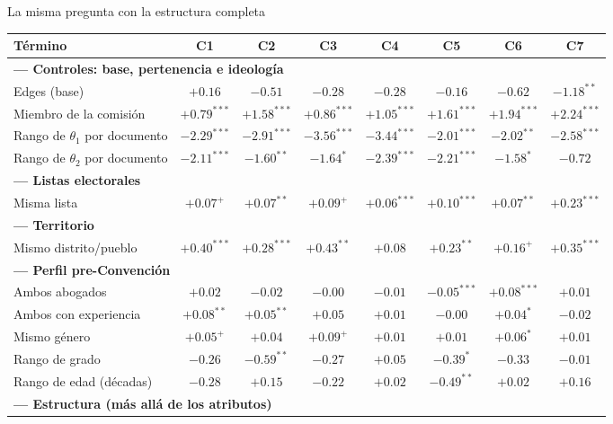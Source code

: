 \documentclass[aspectratio=169,11pt]{beamer}
\newcommand{\emphr}[1]{{\color{ndreddark}\textbf{#1}}}
\begin{document}
\begin{frame}{La misma pregunta con la estructura completa}
\begin{center}\tiny\setlength{\tabcolsep}{3pt}\renewcommand{\arraystretch}{1.25}
\begin{tabular}{lccccccc}
\toprule
Término & C1 & C2 & C3 & C4 & C5 & C6 & C7 \\
\midrule
\multicolumn{8}{l}{\emphr{--- Controles: base, pertenencia e ideología}}\\
Edges (base) & $+0.16$ & $-0.51$ & $-0.28$ & $-0.28$ & $-0.16$ & $-0.62$ & $-1.18^{**}$ \\
Miembro de la comisión & $+0.79^{***}$ & $+1.58^{***}$ & $+0.86^{***}$ & $+1.05^{***}$ & $+1.61^{***}$ & $+1.94^{***}$ & $+2.24^{***}$ \\
Rango de $\theta_1$ por documento & $-2.29^{***}$ & $-2.91^{***}$ & $-3.56^{***}$ & $-3.44^{***}$ & $-2.01^{***}$ & $-2.02^{**}$ & $-2.58^{***}$ \\
Rango de $\theta_2$ por documento & $-2.11^{***}$ & $-1.60^{**}$ & $-1.64^{*}$ & $-2.39^{***}$ & $-2.21^{***}$ & $-1.58^{*}$ & $-0.72$ \\
\multicolumn{8}{l}{\emphr{--- Listas electorales}}\\
Misma lista & $+0.07^{+}$ & $+0.07^{**}$ & $+0.09^{+}$ & $+0.06^{***}$ & $+0.10^{***}$ & $+0.07^{**}$ & $+0.23^{***}$ \\
\multicolumn{8}{l}{\emphr{--- Territorio}}\\
Mismo distrito/pueblo & $+0.40^{***}$ & $+0.28^{***}$ & $+0.43^{**}$ & $+0.08$ & $+0.23^{**}$ & $+0.16^{+}$ & $+0.35^{***}$ \\
\multicolumn{8}{l}{\emphr{--- Perfil pre-Convención}}\\
Ambos abogados & $+0.02$ & $-0.02$ & $-0.00$ & $-0.01$ & $-0.05^{***}$ & $+0.08^{***}$ & $+0.01$ \\
Ambos con experiencia & $+0.08^{**}$ & $+0.05^{**}$ & $+0.05$ & $+0.01$ & $-0.00$ & $+0.04^{*}$ & $-0.02$ \\
Mismo género & $+0.05^{+}$ & $+0.04$ & $+0.09^{+}$ & $+0.01$ & $+0.01$ & $+0.06^{*}$ & $+0.01$ \\
Rango de grado & $-0.26$ & $-0.59^{**}$ & $-0.27$ & $+0.05$ & $-0.39^{*}$ & $-0.33$ & $-0.01$ \\
Rango de edad (décadas) & $-0.28$ & $+0.15$ & $-0.22$ & $+0.02$ & $-0.49^{**}$ & $+0.02$ & $+0.16$ \\
\multicolumn{8}{l}{\emphr{--- Estructura (más allá de los atributos)}}\\

\end{tabular}
\end{center}
\end{frame}
\end{document}
